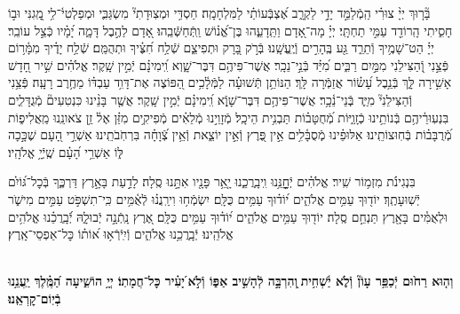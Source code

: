 \documentclass[twoside, openany, parskip=half, 11pt]{book}
\begin{document}
בָּ֘ר֤וּךְ יְיָ֨ צוּרִ֗י הַֽמְֿלַמֵּ֣ד יָדַ֣י לַקְרָ֑ב אֶ֝צְבְּֿעוֹתַ֗י לַמִּלְחָמָֽה׃
חַסְדִּ֥י וּמְצֽוּדָתִי֘ מִשְׂגַּבִּ֢י וּמְפַלְטִי֫־לִ֥י מָֽ֭גִנִּי וּב֣וֹ חָסִ֑יתִי הָֽרוֹדֵ֖ד עַמִּ֣י תַחְתָּֽי׃
יְיָ֗ מָה־אָ֭דָם וַתֵּֽדָעֵ֑הוּ בֶּן־אֱ֝נ֗וֹשׁ וַֽתְּֿחַשְּֿׁבֵֽהוּ׃
אָ֭דָם לַהֶ֣בֶל דָּמָ֑ה יָ֝מָ֗יו כְּֿצֵ֣ל עוֹבֵֽר׃
יְיָ֗ הַט־שָׁמֶ֥יךָ וְֿתֵרֵ֑ד גַּ֖ע בֶּֽהָרִ֣ים וְֿיֶֽעֱשָֽׁנוּ׃
בְּֿרֹ֣ק בָּ֭רָק וּתְפִיצֵ֑ם שְֿׁלַ֥ח חִ֝צֶּ֗יךָ וּתְהֻמֵּֽם׃
שְֿׁלַ֥ח יָדֶ֗יךָ מִמָּ֫ר֥וֹם פְּֿצֵ֣נִי וְֿ֭הַצִּילֵנִי מִמַּ֣יִם רַבִּ֑ים מִ֝יַּ֗ד בְּֿנֵ֣י־נֵכָֽר׃
אֲשֶׁר־פִּיהֶ֥ם דִּבֶּר־שָׁ֑וְא וִֽ֝ימִינָ֗ם יְֿמִ֣ין שָֽׁקֶר׃
אֱלֹהִ֗ים שִׁ֣יר חָ֭דָשׁ אָשִׁ֣ירָה לָּ֑ךְ בְּֿנֵ֥בֶל עָ֝שׂ֗וֹר אֲזַמְּֿרָה לָּֽךְ׃
הַנּוֹתֵ֥ן תְּֿשׁוּעָ֗ה לַמְּֿלָ֫כִ֥ים הַ֭פּוֹצֶה אֶת־דָּוִ֥ד עַבְדּ֗וֹ מֵחֶ֥רֶב רָעָֽה׃
פְּֿצֵ֥נִי וְֿהַצִּילֵנִי֘ מִיַּ֢ד בְּֽֿנֵי־נֵ֫כָ֥ר׃
אֲשֶׁר־פִּיהֶ֥ם דִּבֶּר־שָׁוְֿ֑א וִֽ֝ימִינָ֗ם יְֿמִ֣ין שָֽׁקֶר׃
אֲשֶׁ֤ר בָּנֵ֨ינוּ כִּנְטִעִים֘ מְֿגֻדָּלִ֢ים בִּנְעֽוּרֵ֫יהֶ֥ם בְּֿנוֹתֵ֥ינוּ כְֿזָֽוִ֑יּוֹת מְֿ֝חֻטָּב֗וֹת תַּבְנִ֥ית הֵיכָֽל׃
מְֿזָוֵי֣נוּ מְֿלֵאִ֗ים מְֿפִיקִ֥ים מִזַּ֗ן אֶל֫ זַ֥ן צֹאונֵֽנוּ מַֽאֲלִיפ֑וֹת מְֿ֝רֻבָּב֗וֹת בְּֿחֽוּצוֹתֵֽינוּ׃
אַלּוּפֵ֗ינוּ מְֽֿסֻבָּ֫לִ֥ים אֵ֣ין פֶּ֭רֶץ וְֿאֵ֣ין יוֹצֵ֑את וְֿאֵ֥ין צְֿ֝וָחָ֗ה בִּרְחֹֽבֹתֵֽינוּ׃
אַשְׁרֵ֣י הָ֭עָם שֶׁכָּ֣כָה לּ֑וֹ אַשְׁרֵ֥י הָ֝עָ֗ם שֶֽׁיְֿיָ֥ אֱלֹהָֽיו׃



בִּנְגִינֹ֗ת מִזְמ֥וֹר שִֽׁיר׃
אֱלֹהִ֗ים יְֿחׇׇׇׇָנֵּ֥נוּ וִֽיבָֽרֲכֵ֑נוּ יָ֤אֵ֥ר פָּנָ֖יו אִתָּ֣נוּ סֶֽלָה׃
לָדַ֣עַת בָּאָ֣רֶץ דַּרְכֶּ֑ךָ בְּֿכׇל־גּ֝וֹיִ֗ם יְֿשֽׁוּעָתֶֽךָ׃
יוֹד֖וּךָ עַמִּ֥ים אֱלֹהִ֑ים י֝וֹד֗וּךָ עַמִּ֥ים כֻּלָּֽם׃
יִשְׂמְֿח֥וּ וִירַֽנֲנ֗וּ לְֿאֻ֫מִּ֥ים כִּֽי־תִשְׁפֹּ֣ט עַמִּ֣ים מִישֹׁ֑ר
וּלְאֻמִּ֓ים בָּאָ֖רֶץ תַּנְחֵ֣ם סֶֽלָה׃
יוֹד֖וּךָ עַמִּ֥ים אֱלֹהִ֑ים י֝וֹד֗וּךָ עַמִּ֥ים כֻּלָּֽם׃
אֶ֭רֶץ נָֽתְֿנָ֣ה יְֿבוּלָ֑הּ יְֿ֝בָֽרֲכֵ֗נוּ אֱלֹהִ֥ים אֱלֹהֵֽינוּ׃
יְֿבָֽרֲכֵ֥נוּ אֱלֹהִ֑ים וְֿיִֽיֿרְֿא֥וּ א֝וֹת֗וֹ כׇּל־אַפְסֵי־אָֽרֶץ׃

\\
\textbf{וְה֤וּא רַח֙וּם יְֿכַפֵּ֥ר עָוֹן֘ וְֿלֹ֢א יַ֫שְׁחִ֥ית ֖וְהִרְבָּ֣ה לְֿהָשִׁ֣יב אַפּ֑וֹ וְֿלֹ֣א ֝יָעִ֗יר כׇּל־חֲמָתֽוֹ׃ יְיָ֥ הוֹשִׁ֑יעָה הַ֝מֶּֽ֗לֶךְ יַֽעֲנֵ֥נוּ בְֿיֽוֹם־קׇרְאֵֽנוּ׃}

\clearpage

\barachu

\hamaarivaravim

\ahavasolam

\shema

\veahavta

\vehaya

\vayomer{}
\end{document}
